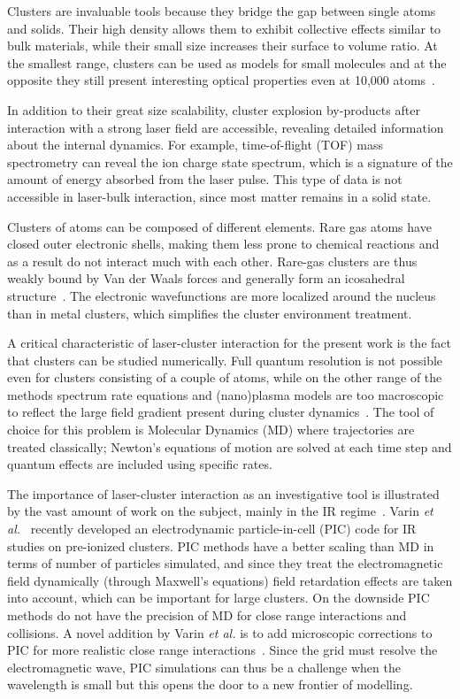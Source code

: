 Clusters are invaluable tools because they bridge the gap between single atoms
and solids. Their high density allows them to exhibit collective effects similar
to bulk materials, while their small
size increases their surface to volume ratio.
At the smallest range, clusters can be used as models for small molecules and
at the opposite they still present interesting optical properties even at 10,000
atoms~\cite{Reinhard2004}.

In addition to their great size scalability, cluster explosion by-products
after interaction with a strong laser field are accessible, revealing detailed
information about the internal dynamics. For example, time-of-flight (TOF) mass
spectrometry can reveal the ion charge state spectrum, which
is a signature of the amount
of energy absorbed from the laser pulse. This type of data is not accessible
in laser-bulk interaction, since most matter remains
in a solid state.

Clusters of atoms can be composed of different elements. Rare gas atoms have
closed outer electronic shells, making them less prone to chemical
reactions and as a result do not interact much with each other. Rare-gas clusters are
thus weakly bound by Van der Waals forces and generally form
an icosahedral structure~\cite{Martin1996}. The electronic wavefunctions are
more localized around the nucleus than in metal clusters, which simplifies the
cluster environment treatment.

A critical characteristic of laser-cluster interaction for the present
work is the fact that clusters can be studied numerically. Full quantum resolution
is not possible even for clusters consisting of a couple of atoms, while on the
other range of the methods spectrum rate equations and (nano)plasma models are
too macroscopic to reflect the large field gradient present during cluster
dynamics~\cite{Fennel2010}. The tool of choice for this problem is Molecular Dynamics
(MD) where trajectories are treated classically; Newton's equations of motion are
solved at each time step and quantum effects are included using specific rates.

The importance of laser-cluster interaction as an investigative tool
is illustrated by the vast amount of work on the subject, mainly
in the IR regime~\cite{Fennel2010}. Varin \textit{et al.}~\cite{Varin2012}
recently developed an electrodynamic
particle-in-cell (PIC) code for IR studies on pre-ionized clusters. PIC methods
have a better scaling than MD in terms of number of particles simulated, and since they treat
the electromagnetic field dynamically (through Maxwell's equations) field
retardation effects are taken into account, which can be important for large
clusters. On the downside PIC methods do not have the precision of MD for close
range interactions and collisions. A novel addition by Varin \textit{et al.}
is to add microscopic corrections to PIC for more realistic close range
interactions~\cite{Peltz2012}.
Since the grid must resolve the electromagnetic wave,
PIC simulations can thus be a challenge when the wavelength is small
but this opens the door to a new frontier of modelling.

